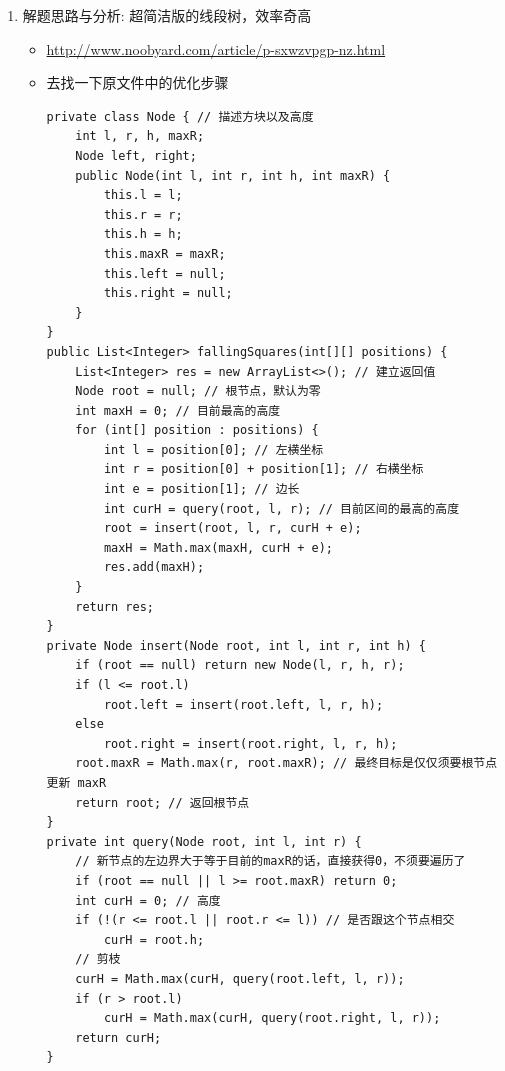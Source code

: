 \documentclass[9pt, b5paaper]{book}
\begin{document}
\begin{enumerate}
\begin{verbatim}
            tree[i].v = tree[i].lazy = c; // 这里 tree[i].v = tree[i].lazy = c : c 是想要更新到的新值v, 用它来更新懒标记和v值
            return ;
        }
        pushDown(i);  // 任务不得不下发，则先下发给两个孩子
        int m = tree[i].l + tree[i].r >> 1;
        if (l <= m) update(i << 1, l, r, c);  // 回归调用，下传更新至左右子节点
        if (m + 1 <= r) update(i << 1 | 1, l, r, c);
        pushUp(i);  // 孩子完成了任务，再修改自己的值
    }
    int query(int i, int l, int r) {
        if (l <= tree[i].l && r >= tree[i].r) return tree[i].v;
        pushDown(i);
        int ans = 0, m = tree[i].l + tree[i].r >> 1;
        if (l <= m) ans = Math.max(ans, query(i << 1, l, r));
        if (m + 1 <= r) ans = Math.max(ans, query(i << 1 | 1, l, r));
        return ans;
    }
    int query() {
        return tree[1].v;
    }
}
\end{verbatim}
\item 解题思路与分析: 超简洁版的线段树，效率奇高
\label{sec-1-0-5-3}
\begin{itemize}
\item \url{http://www.noobyard.com/article/p-sxwzvpgp-nz.html}
\item 去找一下原文件中的优化步骤
\begin{verbatim}
private class Node { // 描述方块以及高度
    int l, r, h, maxR;
    Node left, right;
    public Node(int l, int r, int h, int maxR) {
        this.l = l;
        this.r = r;
        this.h = h;
        this.maxR = maxR;
        this.left = null;
        this.right = null;
    }
}
public List<Integer> fallingSquares(int[][] positions) {
    List<Integer> res = new ArrayList<>(); // 建立返回值
    Node root = null; // 根节点，默认为零
    int maxH = 0; // 目前最高的高度
    for (int[] position : positions) {
        int l = position[0]; // 左横坐标
        int r = position[0] + position[1]; // 右横坐标
        int e = position[1]; // 边长
        int curH = query(root, l, r); // 目前区间的最高的高度
        root = insert(root, l, r, curH + e);
        maxH = Math.max(maxH, curH + e);
        res.add(maxH);
    }
    return res;
}
private Node insert(Node root, int l, int r, int h) {
    if (root == null) return new Node(l, r, h, r);
    if (l <= root.l)
        root.left = insert(root.left, l, r, h);
    else
        root.right = insert(root.right, l, r, h);
    root.maxR = Math.max(r, root.maxR); // 最终目标是仅仅须要根节点更新 maxR
    return root; // 返回根节点
}
private int query(Node root, int l, int r) {
    // 新节点的左边界大于等于目前的maxR的话，直接获得0，不须要遍历了
    if (root == null || l >= root.maxR) return 0; 
    int curH = 0; // 高度
    if (!(r <= root.l || root.r <= l)) // 是否跟这个节点相交
        curH = root.h;
    // 剪枝
    curH = Math.max(curH, query(root.left, l, r));
    if (r > root.l)
        curH = Math.max(curH, query(root.right, l, r));
    return curH;
}
\end{verbatim}
\end{itemize}
\end{enumerate}
\end{document}
